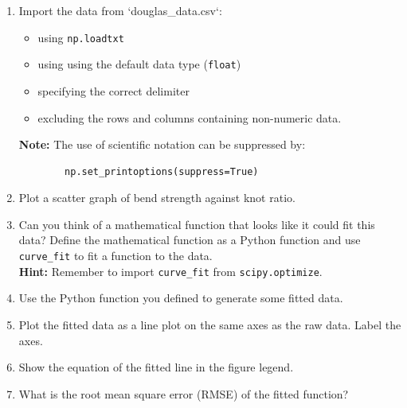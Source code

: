 \documentclass[11pt]{report}
\begin{document}
\begin{enumerate}[label=(\Alph*)]
    \item Import the data from `douglas\_data.csv`:
    \begin{itemize}
        \item using {\tt np.loadtxt}
        \item using using the default data type ({\tt float})
        \item specifying the correct delimiter
        \item excluding the rows and columns containing non-numeric data.
    \end{itemize}
    {\bf Note:} The use of scientific notation can be suppressed by:
    \begin{verbatim}
        np.set_printoptions(suppress=True)
    \end{verbatim}
    
    \item Plot a scatter graph of bend strength against knot ratio. 
    \item Can you think of a mathematical function that looks like it could fit this data? Define the mathematical function as a Python function and use {\tt curve\_fit} to fit a function to the data.\\  {\bf Hint:} Remember to import {\tt curve\_fit} from {\tt scipy.optimize}.  
    \item Use the Python function you defined to generate some fitted data. 
    \item Plot the fitted data as a line plot on the same axes as the raw data. Label the axes.
    \item Show the equation of the fitted line in the figure legend.
    \item What is the root mean square error (RMSE) of the fitted function? 
\end{enumerate}
\end{document}
